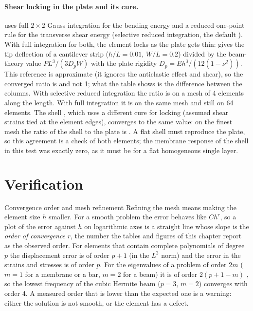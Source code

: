 \paragraph{Shear locking in the plate and its cure.}
 uses full $2\times2$ Gauss integration for the bending energy and a reduced one-point rule for the transverse shear energy (selective reduced integration, the default ). With full integration for both, the element locks as the plate gets thin:  gives the tip deflection of a cantilever strip ($h/L=0.01$, $W/L=0.2$) divided by the beam-theory value $PL^3/(3D_pW)$ with the plate rigidity $D_p=Eh^3/(12(1-\nu^2))$. This reference is approximate (it ignores the anticlastic effect and shear), so the converged ratio is \cecPlateSriFine{} and not 1; what the table shows is the difference between the columns. With selective reduced integration the ratio is \cecPlateSriCoarse{} on a mesh of 4 elements along the length. With full integration it is \cecPlateFullCoarse{} on the same mesh and still \cecPlateFullFine{} on 64 elements. The shell , which uses a different cure for locking (assumed shear strains tied at the element edges), converges to the same value: on the finest mesh the ratio of the shell to the plate is \cecPlateRatioFS. A flat shell must reproduce the plate, so this agreement is a check of both elements; the membrane response of the shell in this test was exactly zero, as it must be for a flat homogeneous single layer.

\begin{table}[ht]
\centering\small

\caption{Tip deflection of a flat cantilever strip divided by the beam-theory value with plate rigidity (an approximate reference), against the number of elements along the length (a quarter as many across).}\label{tab:el-plate}
\end{table}

\section{Verification}\label{sec:el-verif}

\begin{sidenote}{Convergence order and mesh refinement}
Refining the mesh means making the element size $h$ smaller. For a smooth problem the error behaves like $Ch^r$, so a plot of the error against $h$ on logarithmic axes is a straight line whose slope is the \emph{order of convergence} $r$, the number the tables and figures of this chapter report as the observed order. For elements that contain complete polynomials of degree $p$ the displacement error is of order $p+1$ (in the $L^2$ norm) and the error in the strains and stresses is of order $p$. For the eigenvalues of a problem of order $2m$ ($m=1$ for a membrane or a bar, $m=2$ for a beam) it is of order $2(p+1-m)$ \citep{strangfix1973}, so the lowest frequency of the cubic Hermite beam ($p=3$, $m=2$) converges with order 4. A measured order that is lower than the expected one is a warning: either the solution is not smooth, or the element has a defect.
\end{sidenote}

